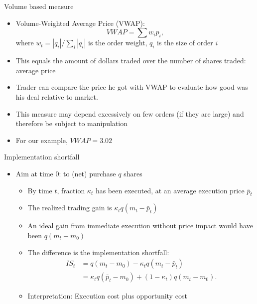\documentclass[english,10pt
,aspectratio=169
]{beamer}
\begin{document}
\begin{frame}{Volume based measure}
\begin{itemize}
	\item \alert{Volume-Weighted Average Price} (VWAP):
	\[
	VWAP = \sum  w_i p_i,
	\]
	where $w_t = |q_i|/\sum_i |q_i|$ is the order weight, $q_i$ is the size of order $i$
	\item This equals the amount of dollars traded over the number of shares traded: average price
	\item Trader can compare the price he got with VWAP to evaluate how good was his deal relative to market.
	\item This measure may depend excessively on few orders (if they are large) and therefore be subject to manipulation
	\item For our example, $VWAP=3.02$
\end{itemize}
\end{frame}


\begin{frame}{Implementation shortfall}
	\begin{itemize}
		\item Aim at time 0: to (net) purchase $q$ shares
		\begin{itemize}
			\item By time $t$, fraction $\kappa_t$ has been executed, at an average execution price $\bar{p}_t$
			\item The realized trading gain is $\kappa_t q(m_t-\bar{p}_t)$
			\item An ideal gain from immediate execution without price impact would have been $q(m_t - m_0)$
			\item The difference is the \alert{implementation shortfall}:
			\begin{align*}
			IS_t 
			& = q(m_t-m_0) - \kappa_t q (m_t - \bar{p}_t) \\
			& = \kappa_t q(\bar{p}_t - m_0) + (1-\kappa_t) q (m_t - m_0).
			\end{align*}
			\item Interpretation: Execution cost plus opportunity cost
		\end{itemize}
	\end{itemize}
\end{frame}
\end{document}
